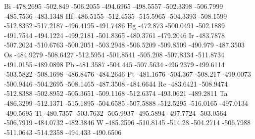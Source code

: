 Bi	-478.2695	-502.849	-506.2055	-494.6965	-498.5557	-502.3398	-506.7999	-485.7536	-483.1348
Hf	-486.5155	-512.4535	-515.5965	-504.3393	-508.1599	-512.8332	-517.2187	-496.4195	-491.7486
Hg	-472.873	-500.0491	-502.1889	-491.7544	-494.1224	-499.2181	-501.8365	-480.3761	-479.2046
Ir	-483.7878	-507.2024	-510.6763	-500.2051	-503.2948	-506.5209	-509.8509	-490.979	-487.3503
Os	-484.9279	-508.6427	-512.5954	-501.8541	-505.208	-507.8334	-511.8734	-491.0155	-489.0898
Pb	-481.3587	-504.445	-507.5634	-496.2379	-499.6114	-503.5822	-508.1698	-486.8476	-484.2646
Pt	-481.1676	-504.367	-508.217	-499.0073	-500.9446	-504.2695	-508.1465	-487.3508	-484.6644
Re	-483.6421	-508.9474	-512.8388	-502.8952	-505.3651	-509.1168	-512.6374	-493.0621	-489.2811
Ta	-486.3299	-512.1371	-515.1895	-504.6585	-507.5888	-512.5295	-516.0165	-497.0134	-490.5695
Tl	-480.7357	-503.7632	-505.9937	-495.5894	-497.7724	-503.0564	-506.7919	-484.0732	-482.3846
W	-485.2596	-510.8145	-514.28		-504.2714	-506.7988	-511.0643	-514.2358	-494.433	-490.6506


